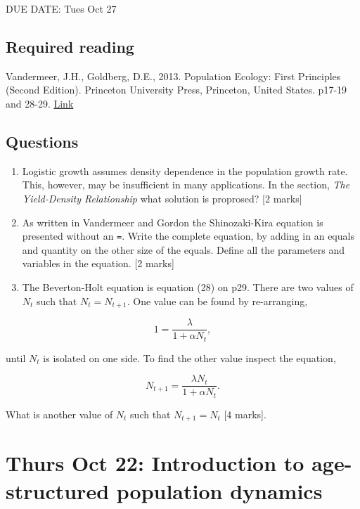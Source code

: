 \documentclass[]{book}
\begin{document}
DUE DATE: Tues Oct 27

\section{Required reading}\label{required-reading}

Vandermeer, J.H., Goldberg, D.E., 2013. Population Ecology: First
Principles (Second Edition). Princeton University Press, Princeton,
United States. p17-19 and 28-29.
\href{https://ebookcentral-proquest-com.qe2a-proxy.mun.ca/lib/mun/detail.action?docID=1205619}{Link}

\section{Questions}\label{questions}

\begin{enumerate}
\def\labelenumi{\arabic{enumi}.}
\item
  Logistic growth assumes density dependence in the population growth
  rate. This, however, may be insufficient in many applications. In the
  section, \emph{The Yield-Density Relationship} what solution is
  proprosed? {[}2 marks{]}
\item
  As written in Vandermeer and Gordon the Shinozaki-Kira equation is
  presented without an \texttt{=}. Write the complete equation, by
  adding in an equals and quantity on the other size of the equals.
  Define all the parameters and variables in the equation. {[}2 marks{]}
\item
  The Beverton-Holt equation is equation (28) on p29. There are two
  values of \(N_t\) such that \(N_t = N_{t+1}\). One value can be found
  by re-arranging,
\end{enumerate}

\[
1 = \frac{\lambda}{1+\alpha N_t},
\]

until \(N_t\) is isolated on one side. To find the other value inspect
the equation,

\[
N_{t+1} = \frac{\lambda N_t}{1+\alpha N_t}.
\]

What is another value of \(N_t\) such that \(N_{t+1}=N_t\) {[}4
marks{]}.

\chapter{Thurs Oct 22: Introduction to age-structured population
dynamics}\label{thurs-oct-22-introduction-to-age-structured-population-dynamics}
\end{document}
